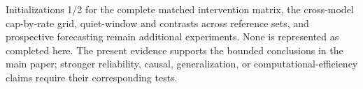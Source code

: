 Initializations 1/2 for the complete matched intervention matrix, the cross-model cap-by-rate grid, quiet-window and contrasts across reference sets, and prospective forecasting remain additional experiments. None is represented as completed here. The present evidence supports the bounded conclusions in the main paper; stronger reliability, causal, generalization, or computational-efficiency claims require their corresponding tests.
